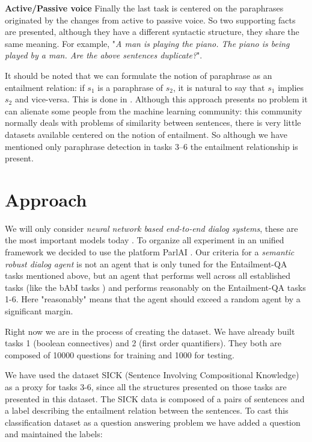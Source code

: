 \textbf{Active/Passive voice} Finally the last task is centered on the paraphrases originated by the changes from active to passive voice. So two supporting facts are presented, although they have a different syntactic structure, they share the same meaning. For example,  "\textit{A man is playing the piano. The piano is being played by a man. Are the above sentences duplicate?}".

It should be noted that we can formulate the notion of paraphrase as an entailment relation: if $s_1$ is a paraphrase of $s_2$, it is natural to say that $s_1$ implies $s_2$ and vice-versa. This is done in \cite{Marelli14}. Although this approach presents no problem it can alienate some people from the machine learning community: this community normally deals  with problems of similarity between sentences, there is very little datasets available centered on the notion of entailment. So although we have mentioned only paraphrase detection in tasks 3--6 the entailment relationship is present.


\section{Approach}
\label{ch:03-Approach}


We will only consider \textit{neural network based end-to-end dialog systems}, these are the most important models today \cite{BordesW16, Lowe:2016, Serban:2016c, Serban:2016a, Shao:2017, Wen}. To organize all experiment in an unified framework we decided to use the platform ParlAI \cite{MillerFFLBBPW17}. Our criteria for a \textit{semantic robust dialog agent} is not an agent that is only tuned for the Entailment-QA tasks mentioned above, but an agent that performs well across all established tasks (like the bAbI tasks \cite{WestonBCM15}) and performs reasonably on the Entailment-QA tasks 1-6. Here "reasonably" means that the agent should exceed a random agent by a significant margin.

Right now we are in the process of creating the dataset. We have already built tasks 1 (boolean connectives) and 2 (first order quantifiers). They both are composed of 10000 questions for training and 1000 for testing.

We have used the dataset SICK (Sentence Involving Compositional Knowledge) \cite{Marelli14} as a proxy for tasks 3-6, since all the structures presented on those tasks are presented in this dataset. The SICK data is composed of a pairs of sentences and a label describing the entailment relation between the sentences. To cast this classification dataset as a question answering problem we have added a question and maintained the labels: 


